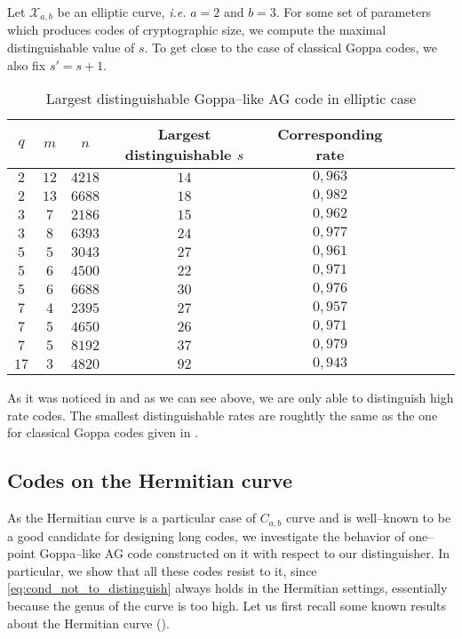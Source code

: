 \documentclass[a4paper]{article}
\theoremstyle{definition}
\theoremstyle{remark}
\newcommand{\calX}{\mathcal{X}}
\begin{document}
Let $\calX_{a,b}$ be an elliptic curve, \emph{i.e.} $a=2$ and $b=3$. For some set of parameters which produces codes of cryptographic size, we compute the maximal distinguishable value of $s$. To get close to the case of classical Goppa codes, we also fix $s'=s+1$.
\begin{table}[h]
\begin{center}
\begin{tabular}{|c|c|c||c|c|c|c|c|c|}
    \hline
    $q$ & $m$ & $n$ & Largest distinguishable $s$ & Corresponding rate\\
    \hline \hline
     $2$ & $12$ & $4218$ & $14$ & $0,963$ \\
    \hline 
     $2$ & $13$ & $6688$ & $18$ & $0,982$  \\
    \hline \hline
     $3$ & $7$ & $2186$ & $15$ & $0,962$ \\
    \hline
     $3$ & $8$ & $6393$ & $24$ & $0,977$ \\
    \hline \hline
     $5$ & $5$ & $3043$ & $27$ & $0,961$  \\
    \hline
     $5$ & $6$ & $4500$ & $22$ & $0,971$ \\
    \hline
     $5$  & $6$ & $6688$ & $30$ & $0,976$ \\
    \hline \hline
     $7$ & $4$ & $2395$ & $27$ & $0,957$ \\
    \hline
      $7$ & $5$ & $4650$ & $26$ & $0,971$ \\
    \hline
      $7$ & $5$ & $8192$ & $37$ & $0,979$ \\
    \hline \hline
      $17$ & $3$ & $4820$ & $92$ & $0,943$ \\
    \hline
\end{tabular}
\caption{Largest distinguishable Goppa--like AG code in elliptic case}
\end{center}
\end{table}

As it was noticed in \cite{MT21} and as we can see above, we are only able to distinguish high rate codes. The smallest distinguishable rates are roughtly the same as the one for classical Goppa codes given in \cite{MT21}. 

\subsection{Codes on the Hermitian curve}

As the Hermitian curve is a particular case of $C_{a,b}$ curve and is well--known to be a good candidate for designing long codes, we investigate the behavior of one--point Goppa--like AG code constructed on it with respect to our distinguisher.
In particular, we show that all these codes resist to it, since  \eqref{eq:cond_not_to_distinguish} always holds in the Hermitian settings, essentially because the genus of the curve is too high. Let us first recall some known results about the Hermitian curve (\cite{Sti09}). 
\end{document}
